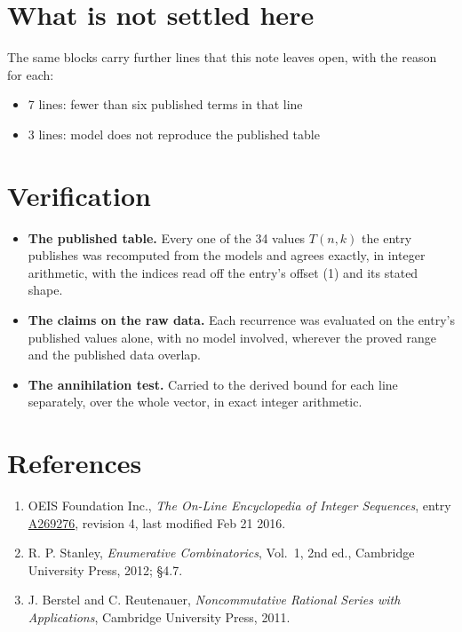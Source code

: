 \documentclass[11pt]{article}
\theoremstyle{definition}
\begin{document}
\section{What is not settled here}

The same blocks carry further lines that this note leaves open, with the reason for each:

\begin{itemize}

\item 7 lines: fewer than six published terms in that line

\item 3 lines: model does not reproduce the published table

\end{itemize}

\section{Verification}

\begin{itemize}

\item {\bfseries The published table.} Every one of the 34 values $T(n,k)$ the entry publishes was recomputed from the models and agrees exactly, in integer arithmetic, with the indices read off the entry's offset (1) and its stated shape.

\item {\bfseries The claims on the raw data.} Each recurrence was evaluated on the entry's published values alone, with no model involved, wherever the proved range and the published data overlap.

\item {\bfseries The annihilation test.} Carried to the derived bound for each line separately, over the whole vector, in exact integer arithmetic.

\end{itemize}

\section{References}

\begin{enumerate}

\item OEIS Foundation Inc., \emph{The On-Line Encyclopedia of Integer Sequences}, entry \href{https://oeis.org/A269276}{A269276}, revision 4, last modified Feb 21 2016.

\item R. P. Stanley, \emph{Enumerative Combinatorics}, Vol.~1, 2nd ed., Cambridge University Press, 2012; \S4.7.

\item J. Berstel and C. Reutenauer, \emph{Noncommutative Rational Series with Applications}, Cambridge University Press, 2011.

\end{enumerate}
\end{document}
